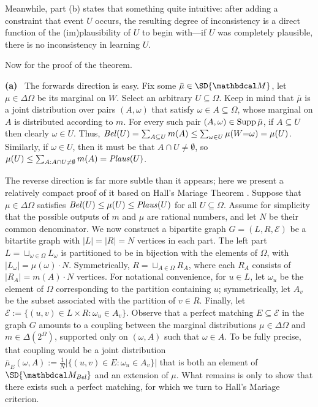 Meanwhile, part (b) states that something quite intuitive: after adding a constraint
that event $U$ occurs, the resulting degree of inconsistency is a direct function of the (im)plausibility of $U$ to begin with---if $U$ was completely plausible, there is no inconsistency in learning $U$. 

Now for the proof of the theorem.

\begin{lproof}
    \textbf{(a)}~
    The forwards direction is easy. 
    Fix some $\bar\mu \in \SD{\dg M}$, let $\mu \in \Delta \Omega$ be its marginal on $W$. 
    Select an arbitrary $U \subseteq \Omega$. 
    Keep in mind that $\bar\mu$ is a joint distribution over pairs $(A, \omega)$ that satisfy $\omega \in A \subseteq \Omega$, whose marginal on $A$ is distributed according to $m$. 
    For every such pair $(A, \omega) \in \operatorname{\mathrm{Supp}} \bar\mu$, 
    if $A \subseteq U$ then clearly $\omega \in U$. 
    Thus, $\mathit{Bel}(U) = \sum_{A \subseteq U} m(A) \le \sum_{\omega \in U} \mu(W{=}\omega) = \mu(U)$.
    Similarly, if $\omega \in U$, then it must be that $A \cap U \ne \emptyset$, 
    so $\mu(U) \le  \sum_{A : A \cap U \ne \emptyset} m(A) = \mathit{Plaus}(U)$.

    The reverse direction is far more subtle than it appears;
        here we present a relatively compact proof of it based on Hall's
        Mariage Theorem \cite{Hall1935}. 
    Suppose that $\mu \in \Delta \Omega$ satisfies
        $\mathit{Bel}(U) \le \mu(U) \le \mathit{Plaus}(U)$ for all $U \subseteq \Omega$.
    Assume for simplicity that the possible outputs of $m$ and $\mu$ are rational numbers, and let $N$ be their common denominator. 
    We now construct a bipartite graph $G = (L, R, \mathcal E)$ be a bitartite graph with $|L| = |R| = N$ vertices in each part.
    The left part $L = \sqcup_{\omega \in \Omega} L_\omega$ 
    is partitioned to be in bijection with the elements of $\Omega$, with
        $|L_\omega| = \mu(\omega)\cdot N$. 
    Symmetrically, $R = \sqcup_{A \in \Omega} R_A$, where each $R_A$
        consists of $|R_A| = m(A) \cdot N$ vertices.
    For notational convenience, for $u \in L$, let $\omega_u$ be the element of $\Omega$ corresponding to the partition containing $u$; symmetrically,  let $A_v$ be the subset associated with the partition of $v \in R$. 
    Finally, let $\mathcal E := \{ (u,v) \in L \times R : \omega_u \in A_v\}.$
    Observe that a perfect matching $E \subseteq \mathcal E$ in the graph $G$ amounts to a coupling between the marginal distributions $\mu \in \Delta\Omega$ and $m \in \Delta(2^\Omega)$, supported only on $(\omega, A)$ such that $\omega \in A$.
    To be fully precise, that coupling would be a joint distribution $\bar\mu_E(\omega, A) := \frac1N |\{ (u,v) \in E : \omega_u \in A_v \}|$ that is both an element of $\SD{\dg M_\Bel}$ and an extension of $\mu$. 
    What remains is only to show that there exists such a perfect matching, for which we turn to Hall's Mariage criterion.     
    

\end{lproof}
